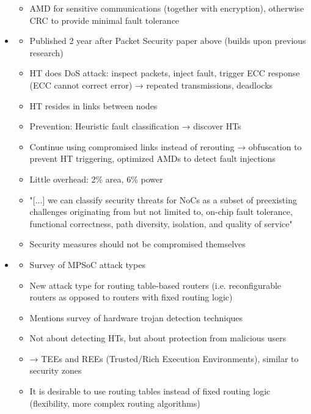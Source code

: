 \begin{itemize}
\begin{itemize}
            \item AMD for sensitive communications (together with encryption), otherwise CRC to provide minimal fault tolerance
        \end{itemize}
    \item \textbf{}
        \begin{itemize}
            \item Published 2 year after Packet Security paper above (builds upon previous research)
            \item HT does DoS attack: inspect packets, inject fault, trigger ECC response (ECC cannot correct error) → repeated transmissions,
                deadlocks
            \item HT resides in links between nodes
            \item Prevention: Heuristic fault classification → discover HTs
            \item Continue using compromised links instead of rerouting → obfuscation to prevent HT triggering, optimized AMDs to detect fault
                injections
            \item Little overhead: 2\% area, 6\% power
            \item "[...] we can classify security threats for NoCs as a subset of preexisting challenges originating from but not limited to,
                on-chip fault tolerance, functional correctness, path diversity, isolation, and quality of service"
            \item Security measures should not be compromised themselves
        \end{itemize}
    \item \textbf{}
        \begin{itemize}
            \item Survey of MPSoC attack types
            \item New attack type for routing table-based routers (i.e. reconfigurable routers as opposed to routers with fixed routing logic)
            \item Mentions survey of hardware trojan detection techniques
            \item Not about detecting HTs, but about protection from malicious users
            \item → TEEs and REEs (Trusted/Rich Execution Environments), similar to security zones
            \item It is desirable to use routing tables instead of fixed routing logic (flexibility, more complex routing algorithms)

\end{itemize}
\end{itemize}
